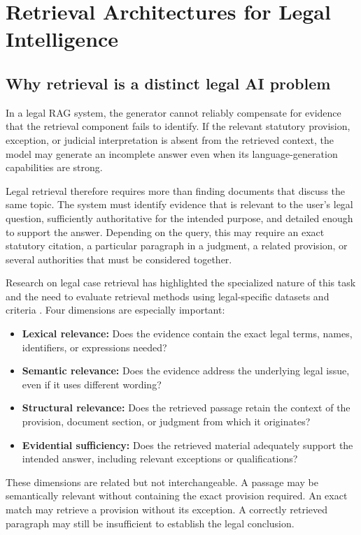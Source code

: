 \section{Retrieval Architectures for Legal Intelligence}
\label{sec:retrieval}

\subsection{Why retrieval is a distinct legal AI problem}

In a legal RAG system, the generator cannot reliably compensate for evidence that the retrieval
component fails to identify. If the relevant statutory provision, exception, or judicial
interpretation is absent from the retrieved context, the model may generate an incomplete answer even
when its language-generation capabilities are strong.

Legal retrieval therefore requires more than finding documents that discuss the same topic. The
system must identify evidence that is relevant to the user's legal question, sufficiently
authoritative for the intended purpose, and detailed enough to support the answer. Depending on the
query, this may require an exact statutory citation, a particular paragraph in a judgment, a related
provision, or several authorities that must be considered together.

Research on legal case retrieval has highlighted the specialized nature of this task and the need to
evaluate retrieval methods using legal-specific datasets and criteria \citep{feng2024}. Four
dimensions are especially important:
\begin{itemize}[leftmargin=1.4em, itemsep=2pt, topsep=2pt]
\item \textbf{Lexical relevance:} Does the evidence contain the exact legal terms, names, identifiers,
or expressions needed?
\item \textbf{Semantic relevance:} Does the evidence address the underlying legal issue, even if it
uses different wording?
\item \textbf{Structural relevance:} Does the retrieved passage retain the context of the provision,
document section, or judgment from which it originates?
\item \textbf{Evidential sufficiency:} Does the retrieved material adequately support the intended
answer, including relevant exceptions or qualifications?
\end{itemize}

These dimensions are related but not interchangeable. A passage may be semantically relevant without
containing the exact provision required. An exact match may retrieve a provision without its
exception. A correctly retrieved paragraph may still be insufficient to establish the legal
conclusion.

